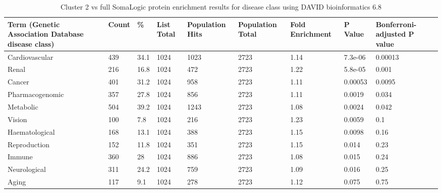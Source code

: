 \documentclass[11pt,twoside]{bristolthesis}
\begin{document}
\begin{landscape}\begin{table}

\caption{\label{tab:DAVID-enrichment-cluster2}Cluster 2 vs full SomaLogic protein enrichment results for disease class using DAVID bioinformatics 6.8}
\centering
\begin{tabu} to 
\toprule
Term (Genetic Association Database disease class) & Count & \% & List Total &   Population Hits & Population Total & Fold Enrichment & P Value & Bonferroni-adjusted P value\\
\midrule
Cardiovascular & 439 & 34.1 & 1024 & 1023 & 2723 & 1.14 & 7.3e-06 & 0.00013\\
Renal & 216 & 16.8 & 1024 & 472 & 2723 & 1.22 & 5.8e-05 & 0.001\\
Cancer & 401 & 31.2 & 1024 & 958 & 2723 & 1.11 & 0.00053 & 0.0095\\
Pharmacogenomic & 357 & 27.8 & 1024 & 856 & 2723 & 1.11 & 0.0019 & 0.034\\
Metabolic & 504 & 39.2 & 1024 & 1243 & 2723 & 1.08 & 0.0024 & 0.042\\
\addlinespace
Vision & 100 & 7.8 & 1024 & 216 & 2723 & 1.23 & 0.0059 & 0.1\\
Haematological & 168 & 13.1 & 1024 & 388 & 2723 & 1.15 & 0.0098 & 0.16\\
Reproduction & 152 & 11.8 & 1024 & 351 & 2723 & 1.15 & 0.014 & 0.23\\
Immune & 360 & 28 & 1024 & 886 & 2723 & 1.08 & 0.015 & 0.24\\
Neurological & 311 & 24.2 & 1024 & 759 & 2723 & 1.09 & 0.016 & 0.25\\
\addlinespace
Aging & 117 & 9.1 & 1024 & 278 & 2723 & 1.12 & 0.075 & 0.75\\
\bottomrule
\end{tabu}
\end{table}
\end{landscape}
\end{document}
